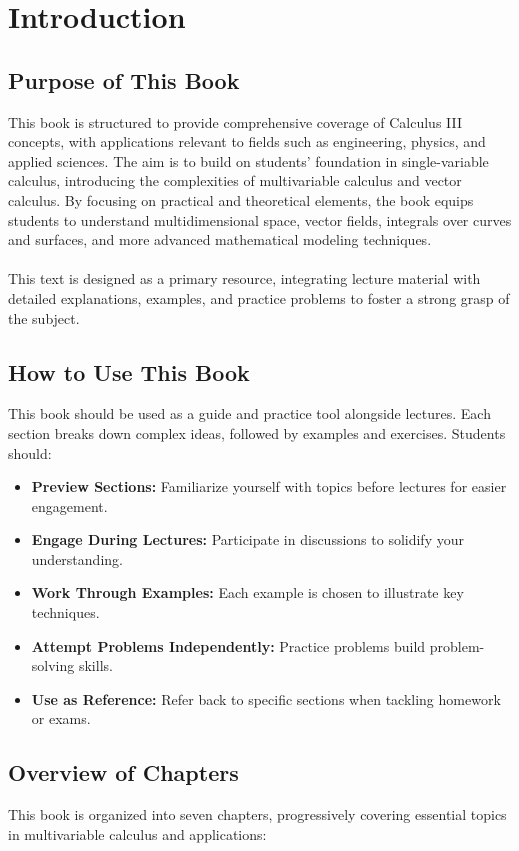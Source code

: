 
\chapter*{Introduction}

\section*{Purpose of This Book}
This book is structured to provide comprehensive coverage of Calculus III concepts, with applications relevant to fields such as engineering, physics, and applied sciences. The aim is to build on students' foundation in single-variable calculus, introducing the complexities of multivariable calculus and vector calculus. By focusing on practical and theoretical elements, the book equips students to understand multidimensional space, vector fields, integrals over curves and surfaces, and more advanced mathematical modeling techniques. \\ \\ This text is designed as a primary resource, integrating lecture material with detailed explanations, examples, and practice problems to foster a strong grasp of the subject.

\section*{How to Use This Book}
This book should be used as a guide and practice tool alongside lectures. Each section breaks down complex ideas, followed by examples and exercises. Students should:
\begin{itemize}
    \item \textbf{Preview Sections:} Familiarize yourself with topics before lectures for easier engagement.
    \item \textbf{Engage During Lectures:} Participate in discussions to solidify your understanding.
    \item \textbf{Work Through Examples:} Each example is chosen to illustrate key techniques.
    \item \textbf{Attempt Problems Independently:} Practice problems build problem-solving skills.
    \item \textbf{Use as Reference:} Refer back to specific sections when tackling homework or exams.
\end{itemize}

\section*{Overview of Chapters}
This book is organized into seven chapters, progressively covering essential topics in multivariable calculus and applications:

